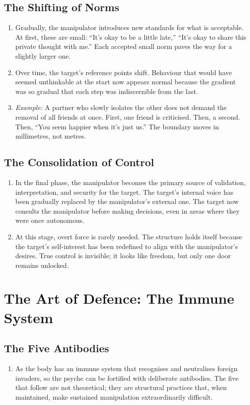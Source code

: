 \documentclass[12pt,a4paper,oneside]{book}
\begin{document}
\section{The Shifting of Norms}
\begin{enumerate}[leftmargin=*, label=\arabic*.]
\item Gradually, the manipulator introduces new standards for what is acceptable. At first, these are small: “It's okay to be a little late,” “It's okay to share this private thought with me.” Each accepted small norm paves the way for a slightly larger one.
\item Over time, the target's reference points shift. Behaviour that would have seemed unthinkable at the start now appears normal because the gradient was so gradual that each step was indiscernible from the last.
\item \textit{Example:} A partner who slowly isolates the other does not demand the removal of all friends at once. First, one friend is criticised. Then, a second. Then, “You seem happier when it's just us.” The boundary moves in millimetres, not metres.
\end{enumerate}

\section{The Consolidation of Control}
\begin{enumerate}[leftmargin=*, label=\arabic*.]
\item In the final phase, the manipulator becomes the primary source of validation, interpretation, and security for the target. The target's internal voice has been gradually replaced by the manipulator's external one. The target now consults the manipulator before making decisions, even in areas where they were once autonomous.
\item At this stage, overt force is rarely needed. The structure holds itself because the target's self-interest has been redefined to align with the manipulator's desires. True control is invisible; it looks like freedom, but only one door remains unlocked.
\end{enumerate}

\chapter{The Art of Defence: The Immune System}
\section{The Five Antibodies}
\begin{enumerate}[leftmargin=*, label=\arabic*.]
\item As the body has an immune system that recognises and neutralises foreign invaders, so the psyche can be fortified with deliberate antibodies. The five that follow are not theoretical; they are structural practices that, when maintained, make sustained manipulation extraordinarily difficult.
\end{enumerate}
\end{document}
